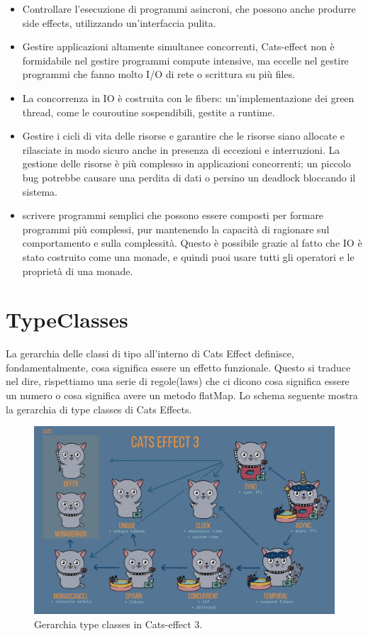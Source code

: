 \begin{itemize}
    \item Controllare l'esecuzione di programmi asincroni, che possono anche produrre side effects, utilizzando un’interfaccia pulita.
    \item Gestire applicazioni altamente simultanee concorrenti, Cats-effect non è formidabile nel gestire programmi compute intensive, ma eccelle nel gestire programmi che fanno molto I/O di rete o scrittura su più files.
    \item  La concorrenza in IO  è costruita con le fibers: un'implementazione dei green thread, come le couroutine sospendibili, gestite a runtime. 
    \item Gestire i cicli di vita delle risorse e garantire che le risorse siano allocate e rilasciate in modo sicuro anche in presenza di eccezioni e interruzioni. La gestione delle risorse è più complesso in applicazioni concorrenti; un piccolo bug potrebbe causare una perdita di dati o persino un deadlock bloccando il sistema.
    \item  scrivere programmi semplici che possono essere composti per formare programmi più complessi, pur mantenendo la capacità di ragionare sul comportamento e sulla complessità. Questo è possibile grazie al fatto che IO è stato costruito come una monade, e quindi puoi usare tutti gli operatori e le proprietà di una monade.
\end{itemize}


\section{TypeClasses}
La gerarchia delle classi di tipo all'interno di Cats Effect definisce, fondamentalmente, cosa significa essere un effetto funzionale. Questo si traduce nel dire, rispettiamo una serie di regole(laws) che ci dicono cosa significa essere un numero o cosa significa avere un metodo flatMap. Lo schema seguente mostra la gerarchia di type classes di Cats Effects.

\begin{figure}[H]
    \centering
    \includegraphics[scale=0.2]{img/hierarchy-impure.jpeg}
    \caption{Gerarchia type classes in Cats-effect 3.}
    \label{fig: Gerarchia type classes in Cats-effect 3}
\end{figure}

